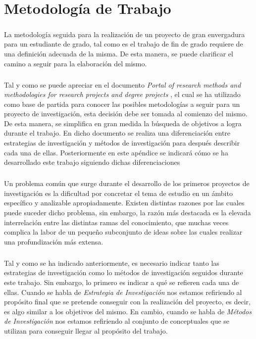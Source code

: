 \documentclass{subfiles}
\begin{document}
  \chapter{Metodología de Trabajo}
  \label{chap:methodology}

    \paragraph{}
    La metodología seguida para la realización de un proyecto de gran envergadura para un estudiante de grado, tal como es el trabajo de fin de grado requiere de una definición adecuada de la misma. De esta manera, se puede clarificar el camino a seguir para la elaboración del mismo.

    \paragraph{}
    Tal y como se puede apreciar en el documento \emph{Portal of research methods and methodologies for research projects and degree projects} \cite{haakansson2013portal}, el cual se ha utilizado como base de partida para conocer las posibles metodologías a seguir para un proyecto de investigación, esta decisión debe ser tomada al comienzo del mismo. De esta manera, se simplifica en gran medida la búsqueda de objetivos a logra durante el trabajo. En dicho documento \cite{haakansson2013portal} se realiza una diferenciación entre estrategias de investigación y métodos de investigación para después describir cada una de ellas. Posteriormente en este apéndice se indicará cómo se ha desarrollado este trabajo siguiendo dichas diferenciaciones

    \paragraph{}
    Un problema común que surge durante el desarrollo de los primeros proyectos de investigación es la dificultad por concretar el tema de estudio en un ámbito específico y analizable apropiadamente. Existen distintas razones por las cuales puede suceder dicho problema, sin embargo, la razón más destacada es la elevada interrelación entre las distintas ramas del conocimiento, que muchas veces complica la labor de  un pequeño subconjunto de ideas sobre las cuales realizar una profundización más extensa.

    \paragraph{}
    Tal y como se ha indicado anteriormente, es necesario indicar tanto las estrategias de investigación como lo métodos de investigación seguidos durante este trabajo. Sin embargo, lo primero es indicar a qué se refieren cada una de ellas. Cuando se habla de \emph{Estrategia de Investigación} nos estamos refiriendo al propósito final que se pretende conseguir con la realización del proyecto, es decir, es algo similar a los objetivos del mismo. En cambio, cuando se habla de \emph{Métodos de Investigación} nos estamos refiriendo al conjunto de  conceptuales que se utilizan para conseguir llegar al propósito del trabajo.
\end{document}
